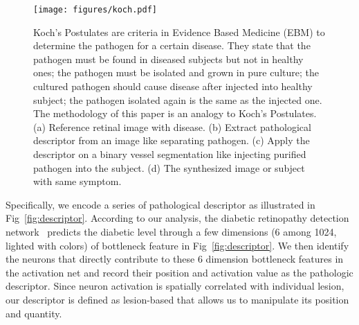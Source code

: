 \documentclass[letterpaper]{article} %
\begin{document}
	\begin{figure*}[h!]
		\begin{center}
			\texttt{[image: figures/koch.pdf]}
		\end{center}
		\caption{Koch's Postulates are criteria in Evidence Based Medicine (EBM) to determine the pathogen for a certain disease. They state that the pathogen must be found in diseased subjects but not in healthy ones; the pathogen must be isolated and grown in pure culture; the cultured pathogen should cause disease after injected into healthy subject; the pathogen isolated again is the same as the injected one. The methodology of this paper is an analogy to Koch's Postulates. (a) Reference retinal image with disease. (b) Extract pathological descriptor from an image like separating pathogen. (c) Apply the descriptor on a binary vessel segmentation like injecting purified pathogen into the subject. (d) The synthesized image or subject with same symptom.}
		\label{fig:koch}
	\end{figure*}



	Specifically, we  encode a series of pathological descriptor as illustrated in Fig~\ref{fig:descriptor}. According to our analysis, the diabetic retinopathy detection network~\cite{oO2016detector} predicts the diabetic level through a few dimensions (6 among 1024, lighted with colors) of bottleneck feature in Fig~\ref{fig:descriptor}. We then identify the neurons that directly contribute to these 6 dimension bottleneck features in the activation net and record their position and activation value as the pathologic descriptor. Since neuron activation is spatially correlated with individual lesion, our descriptor is defined as lesion-based that allows us to manipulate its position and quantity.
\end{document}
